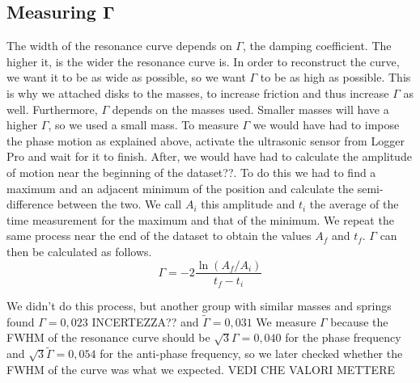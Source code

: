 \documentclass{article}
\begin{document}
\subsection{Measuring $\bm \Gamma$}
The width of the resonance curve depends on $\Gamma$, the damping coefficient. The higher it, is the wider the resonance curve is. In order to reconstruct the curve, we want it to be as wide as possible, so we want $\Gamma$ to be as high as possible. This is why we attached disks to the masses, to increase friction and thus increase $\Gamma$ as well. Furthermore, $\Gamma$ depends on the masses used. Smaller masses will have a higher $\Gamma$, so we used a small mass. %
To measure $\Gamma$ we would have had to impose the phase motion as explained above, activate the ultrasonic sensor from Logger Pro and wait for it to finish. After, we would have had to calculate the amplitude of motion near the beginning of the dataset??. To do this we had to find a maximum and an adjacent minimum of the position and calculate the semi-difference between the two. We call $A_i$ this amplitude and $t_i$ the average of the time measurement for the maximum and that of the minimum. We repeat the same process near the end of the dataset to obtain the values $A_f$ and $t_f$. $\Gamma$ can then be calculated as follows.
\begin{equation}
    \Gamma = -2 \frac{ \ln(A_f / A_i) }{ t_f-t_i }
\end{equation}

We didn't do this process, but another group with similar masses and springs found $\Gamma = 0,023$ INCERTEZZA?? and $\tilde \Gamma = 0,031$
We measure $\Gamma$ because the FWHM of the resonance curve should be $\sqrt 3 \Gamma = 0,040$ for the phase frequency and $\sqrt 3 \tilde \Gamma = 0,054$ for the anti-phase frequency, so we later checked whether the FWHM of the curve was what we expected. VEDI CHE VALORI METTERE


\end{document}
